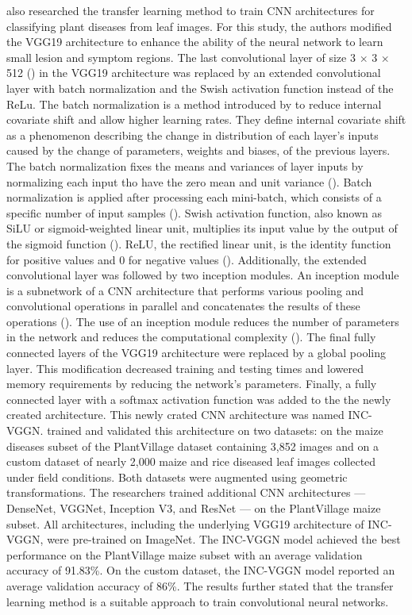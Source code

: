 \documentclass{BachelorBUI}
\begin{document}
\textcite{Chen:2020} also researched the transfer learning method to train CNN architectures for classifying plant diseases from leaf images. For this study, the authors modified the VGG19 architecture to enhance the ability of the neural network to learn small lesion and symptom regions. The last convolutional layer of size 3 $\times$ 3 $\times$ 512 (\cite{Simonyan:2015}) in the VGG19 architecture was replaced by an extended convolutional layer with batch normalization and the Swish activation function instead of the ReLu. The batch normalization is a method introduced by \textcite{Szegedy:2015:2} to reduce internal covariate shift and allow higher learning rates. They define internal covariate shift as a phenomenon describing the change in distribution of each layer's inputs caused by the change of parameters, weights and biases, of the previous layers. The batch normalization fixes the means and variances of layer inputs by normalizing each input tho have the zero mean and unit variance (\cite{Szegedy:2015:2}). Batch normalization is applied after processing each mini-batch, which consists of a specific number of input samples (\cite{Szegedy:2015:2}). Swish activation function, also known as SiLU or sigmoid-weighted linear unit, multiplies its input value by the output of the sigmoid function (\cite{Dubey:2022}). ReLU, the rectified linear unit, is the identity function for positive values and 0 for negative values (\cite{Dubey:2022}). Additionally, the extended convolutional layer was followed by two inception modules. An inception module is a subnetwork of a CNN architecture that performs various pooling and convolutional operations in parallel and concatenates the results of these operations (\cite{Szegedy:2015:1,Gu:2018}). The use of an inception module reduces the number of parameters in the network and reduces the computational complexity (\cite{Szegedy:2015:1,Gu:2018}). The final fully connected layers of the VGG19 architecture were replaced by a global pooling layer. This modification decreased training and testing times and lowered memory requirements by reducing the network's parameters. Finally, a fully connected layer with a softmax activation function was added to the the newly created architecture. This newly crated CNN architecture was named INC-VGGN. \textcite{Chen:2020} trained and validated this architecture on two datasets: on the maize diseases subset of the PlantVillage dataset containing 3,852 images and on a custom dataset of nearly 2,000 maize and rice diseased leaf images collected under field conditions. Both datasets were augmented using geometric transformations. The researchers trained additional CNN architectures --- DenseNet, VGGNet, Inception V3, and ResNet --- on the PlantVillage maize subset. All architectures, including the underlying VGG19 architecture of INC-VGGN, were pre-trained on ImageNet. The INC-VGGN model achieved the best performance on the PlantVillage maize subset with an average validation accuracy of 91.83\%. On the custom dataset, the INC-VGGN model reported an average validation accuracy of 86\%. The results further stated that the transfer learning method is a suitable approach to train convolutional neural networks.
\end{document}

